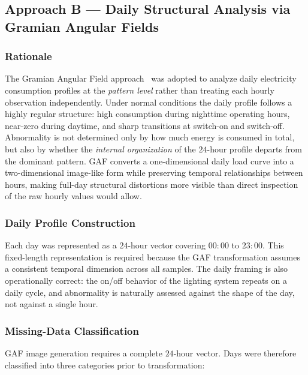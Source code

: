\documentclass[11pt]{article}
\begin{document}
\subsection{Approach B --- Daily Structural Analysis via Gramian Angular Fields}
\label{subsec:approachB}

\subsubsection*{Rationale}
The Gramian Angular Field approach~\cite{wang2015gaf,wang2015imaging} was adopted to analyze daily electricity consumption profiles at the \emph{pattern level} rather than treating each hourly observation independently. Under normal conditions the daily profile follows a highly regular structure: high consumption during nighttime operating hours, near-zero during daytime, and sharp transitions at switch-on and switch-off. Abnormality is not determined only by how much energy is consumed in total, but also by whether the \emph{internal organization} of the $24$-hour profile departs from the dominant pattern. GAF converts a one-dimensional daily load curve into a two-dimensional image-like form while preserving temporal relationships between hours, making full-day structural distortions more visible than direct inspection of the raw hourly values would allow.

\subsubsection*{Daily Profile Construction}
Each day was represented as a $24$-hour vector covering $00{:}00$ to $23{:}00$. This fixed-length representation is required because the GAF transformation assumes a consistent temporal dimension across all samples. The daily framing is also operationally correct: the on/off behavior of the lighting system repeats on a daily cycle, and abnormality is naturally assessed against the shape of the day, not against a single hour.

\subsubsection*{Missing-Data Classification}
GAF image generation requires a complete $24$-hour vector. Days were therefore classified into three categories prior to transformation:
\end{document}
